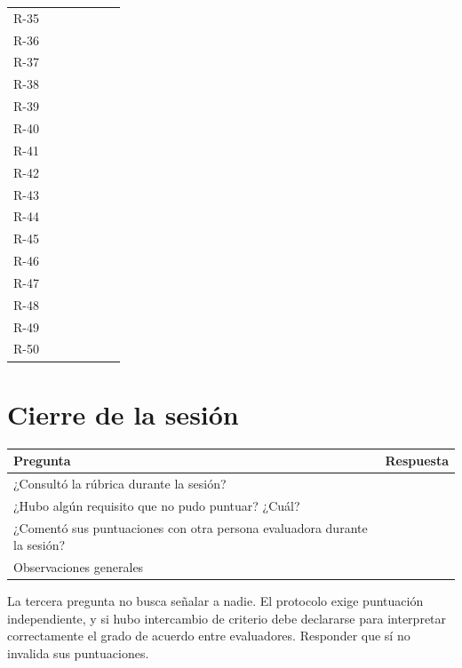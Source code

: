 \documentclass[11pt,a4paper]{article}
\begin{document}
\begin{longtable}{C{1.6cm} C{1.3cm} C{1.3cm} C{1.3cm} C{1.3cm} C{1.3cm} L{5.4cm}}
R-35 & & & & & & \\
R-36 & & & & & & \\
R-37 & & & & & & \\
R-38 & & & & & & \\
R-39 & & & & & & \\
R-40 & & & & & & \\
R-41 & & & & & & \\
R-42 & & & & & & \\
R-43 & & & & & & \\
R-44 & & & & & & \\
R-45 & & & & & & \\
R-46 & & & & & & \\
R-47 & & & & & & \\
R-48 & & & & & & \\
R-49 & & & & & & \\
R-50 & & & & & & \\
\end{longtable}

\newpage

\section*{Cierre de la sesión}

\renewcommand{\arraystretch}{1.4}
\begin{center}
\begin{tabular}{L{7.5cm} L{8.5cm}}
\toprule
{}
\textbf{Pregunta} & \textbf{Respuesta} \\
\midrule
¿Consultó la rúbrica durante la sesión? & \\
¿Hubo algún requisito que no pudo puntuar? ¿Cuál? & \\
¿Comentó sus puntuaciones con otra persona evaluadora durante la sesión? & \\
Observaciones generales & \\[3ex]
\bottomrule
\end{tabular}
\end{center}

\vspace{10pt}

\begin{tcolorbox}[colback=white,colframe=uteqverde!45,boxrule=0.5pt,arc=2pt]
\footnotesize
La tercera pregunta no busca señalar a nadie. El protocolo exige puntuación
independiente, y si hubo intercambio de criterio debe declararse para
interpretar correctamente el grado de acuerdo entre evaluadores. Responder que
sí no invalida sus puntuaciones.
\end{tcolorbox}
\end{document}

